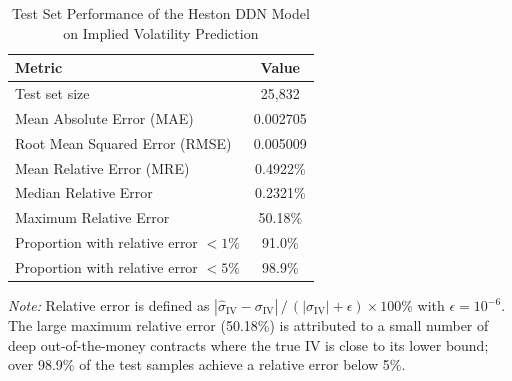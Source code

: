 \begin{table}[htbp]
  \centering
  \caption{Test Set Performance of the Heston DDN Model on Implied Volatility Prediction}
  \label{tab:test_performance}
  \begin{tabular}{lc}
    \toprule
    \textbf{Metric} & \textbf{Value} \\
    \midrule
    Test set size                               & 25,832 \\
    \midrule
    Mean Absolute Error (MAE)                   & 0.002705 \\
    Root Mean Squared Error (RMSE)              & 0.005009 \\
    Mean Relative Error (MRE)                   & 0.4922\% \\
    Median Relative Error                       & 0.2321\% \\
    Maximum Relative Error                      & 50.18\% \\
    \midrule
    Proportion with relative error $< 1\%$      & 91.0\% \\
    Proportion with relative error $< 5\%$      & 98.9\% \\
    \bottomrule
  \end{tabular}
  \begin{tablenotes}
    \small
    \item \textit{Note:} Relative error is defined as $|\hat{\sigma}_{\text{IV}} - \sigma_{\text{IV}}|\,/\,(|\sigma_{\text{IV}}| + \epsilon)\times 100\%$ with $\epsilon = 10^{-6}$.
    The large maximum relative error (50.18\%) is attributed to a small number of deep out-of-the-money contracts where the true IV is close to its lower bound; over 98.9\% of the test samples achieve a relative error below 5\%.
  \end{tablenotes}
\end{table}
